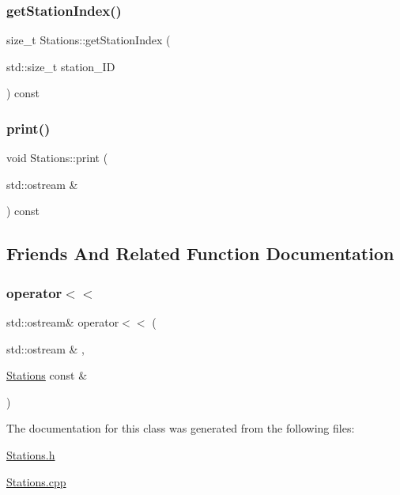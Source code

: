 \mbox{\label{classanen_sta_1_1_stations_af484bcbd06e625b31af987aa9b31316c}} 
\subsubsection{\texorpdfstring{get\+Station\+Index()}{getStationIndex()}}
{\footnotesize\ttfamily size\+\_\+t Stations\+::get\+Station\+Index (\begin{DoxyParamCaption}\item[{std\+::size\+\_\+t}]{station\+\_\+\+ID }\end{DoxyParamCaption}) const}

\mbox{\label{classanen_sta_1_1_stations_ae62b158dedf5f15c385671d15b950dc5}} 
\subsubsection{\texorpdfstring{print()}{print()}}
{\footnotesize\ttfamily void Stations\+::print (\begin{DoxyParamCaption}\item[{std\+::ostream \&}]{ }\end{DoxyParamCaption}) const}



\subsection{Friends And Related Function Documentation}
\mbox{\label{classanen_sta_1_1_stations_a6c2ba44849c083fa6d206d4573ea523e}} 
\subsubsection{\texorpdfstring{operator$<$$<$}{operator<<}}
{\footnotesize\ttfamily std\+::ostream\& operator$<$$<$ (\begin{DoxyParamCaption}\item[{std\+::ostream \&}]{,  }\item[{\mbox{\hyperlink{classanen_sta_1_1_stations}{Stations}} const \&}]{ }\end{DoxyParamCaption})\hspace{0.3cm}{\ttfamily [friend]}}



The documentation for this class was generated from the following files\+:\begin{DoxyCompactItemize}
\item 
\mbox{\hyperlink{_stations_8h}{Stations.\+h}}\item 
\mbox{\hyperlink{_stations_8cpp}{Stations.\+cpp}}\end{DoxyCompactItemize}
